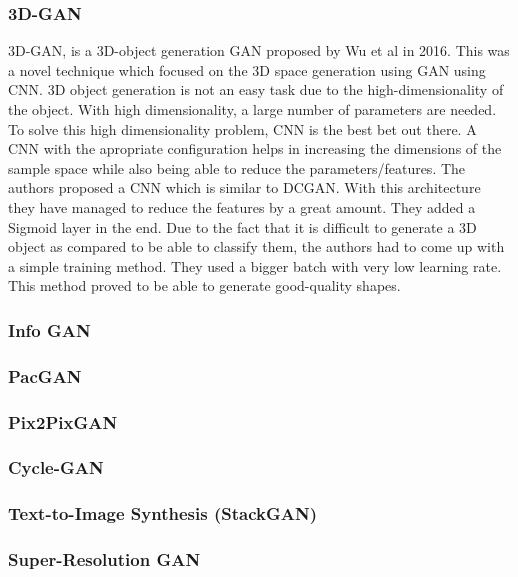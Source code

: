 \documentclass[conference]{IEEEtran}
\begin{document}
\subsubsection{3D-GAN}
3D-GAN, is a 3D-object generation GAN proposed by Wu et al \cite{b8} in 2016. This was a novel technique which focused on the 3D space generation using GAN using CNN. 3D object generation is not an easy task due to the high-dimensionality of the object. With high dimensionality, a large number of parameters are needed. To solve this high dimensionality problem, CNN is the best bet out there. A CNN with the apropriate configuration helps in increasing the dimensions of the sample space while also being able to reduce the parameters/features. The authors proposed a CNN which is similar to DCGAN. With this architecture they have managed to reduce the features by a great amount. They added a Sigmoid layer in the end. Due to the fact that it is difficult to generate a 3D object as compared to be able to classify them, the authors had to come up with a simple training method. They used a bigger batch with very low learning rate. This method proved to be able to generate good-quality shapes.

\subsubsection{Info GAN}

\subsubsection{PacGAN}

\subsubsection{Pix2PixGAN}

\subsubsection{Cycle-GAN}

\subsubsection{Text-to-Image Synthesis (StackGAN)}

\subsubsection{Super-Resolution GAN}
\end{document}
